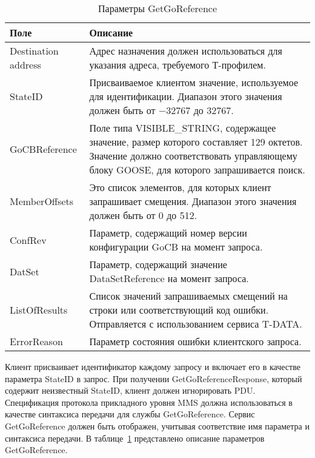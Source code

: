 \begin{table}[ht]
    \caption{Параметры GetGoReference}
    \label{table:domain:get_go_ref_params}
    \begin{tabular}{| >{\raggedright}m{}
                    | >{\raggedright\arraybackslash}m{}|}
        \hline
        \centering Поле & \centering\arraybackslash Описание \\

        \hline
        Destination address & Адрес назначения должен использоваться для указания адреса, требуемого Т-профилем. \\

        \hline
        StateID & Присваиваемое клиентом значение, используемое для идентификации.
        Диапазон этого значения должен быть от $ -32767 $ до $ 32767 $. \\

        \hline
        GoCBReference & Поле типа VISIBLE\_STRING, содержащее значение,
        размер которого составляет 129 октетов. Значение должно соответствовать
        управляющему блоку GOOSE, для которого запрашивается поиск. \\

        \hline
        MemberOffsets & Это список элементов, для которых клиент запрашивает смещения. Диапазон этого значения должен быть от 0 до 512. \\

        \hline
        ConfRev & Параметр, содержащий номер версии конфигурации GoCB на момент запроса. \\

        \hline
        DatSet & Параметр, содержащий значение DataSetReference на момент запроса. \\

        \hline
        ListOfResults & Список значений запрашиваемых смещений на строки или
        соответствующий код ошибки. Отправляется с использованием сервиса T-DATA. \\

        \hline
        ErrorReason & Параметр состояния ошибки клиентского запроса. \\

        \hline
    \end{tabular}
\end{table}

Клиент присваивает идентификатор каждому запросу и включает его в качестве параметра
StateID в запрос. При получении GetGoReferenceResponse, который содержит неизвестный
StateID, клиент должен игнорировать PDU. Спецификация протокола прикладного уровня
MMS должна использоваться в качестве синтаксиса передачи для службы GetGoReference.
Сервис GetGoReference должен быть отображен, учитывая соответствие имя параметра
и синтаксиса передачи.
В таблице~\ref{table:domain:get_go_ref_params} представлено описание параметров
GetGoReference.

